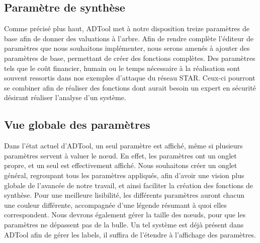 	\subsection{Paramètre de synthèse}
	Comme précisé plus haut, ADTool met à notre disposition treize paramètres de base afin de donner des valuations à l'arbre. Afin de rendre complète l'éditeur de paramètres que nous souhaitons implémenter, nous serons amenés à ajouter des paramètres de base, permettant de créer des fonctions complètes. Des paramètres tels que le coût financier, humain ou le temps nécessaire à la réalisation sont souvent ressortis dans nos exemples d'attaque du réseau STAR. Ceux-ci pourront se combiner afin de réaliser des fonctions dont aurait besoin un expert en sécurité désirant réaliser l'analyse d'un système.
		
	\subsection{Vue globale des paramètres}
	Dans l'état actuel d'ADTool, un seul paramètre est affiché, même si plusieurs paramètres servent à valuer le nœud. En effet, les paramètres ont un onglet propre, et un seul est effectivement affiché. Nous souhaitons créer un onglet général, regroupant tous les paramètres appliqués, afin d'avoir une vision plus globale de l'avancée de notre travail, et ainsi faciliter la création des fonctions de synthèse.
	Pour une meilleure lisibilité, les différents paramètres auront chacun une couleur différente, accompagnée d'une légende résumant à quoi elles correspondent.
	Nous devrons également gérer la taille des nœuds, pour que les paramètres ne dépassent pas de la bulle. Un tel système est déjà présent dans ADTool afin de gérer les labels, il suffira de l'étendre à l'affichage des paramètres.
